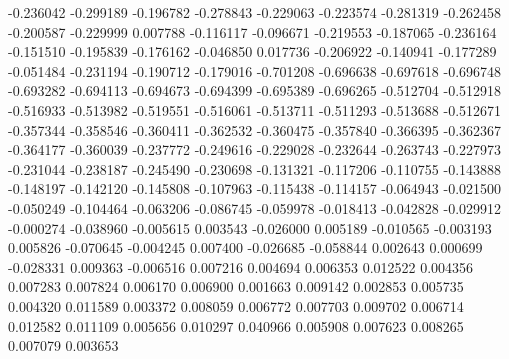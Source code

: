 -0.236042
-0.299189
-0.196782
-0.278843
-0.229063
-0.223574
-0.281319
-0.262458
-0.200587
-0.229999
0.007788
-0.116117
-0.096671
-0.219553
-0.187065
-0.236164
-0.151510
-0.195839
-0.176162
-0.046850
0.017736
-0.206922
-0.140941
-0.177289
-0.051484
-0.231194
-0.190712
-0.179016
-0.701208
-0.696638
-0.697618
-0.696748
-0.693282
-0.694113
-0.694673
-0.694399
-0.695389
-0.696265
-0.512704
-0.512918
-0.516933
-0.513982
-0.519551
-0.516061
-0.513711
-0.511293
-0.513688
-0.512671
-0.357344
-0.358546
-0.360411
-0.362532
-0.360475
-0.357840
-0.366395
-0.362367
-0.364177
-0.360039
-0.237772
-0.249616
-0.229028
-0.232644
-0.263743
-0.227973
-0.231044
-0.238187
-0.245490
-0.230698
-0.131321
-0.117206
-0.110755
-0.143888
-0.148197
-0.142120
-0.145808
-0.107963
-0.115438
-0.114157
-0.064943
-0.021500
-0.050249
-0.104464
-0.063206
-0.086745
-0.059978
-0.018413
-0.042828
-0.029912
-0.000274
-0.038960
-0.005615
0.003543
-0.026000
0.005189
-0.010565
-0.003193
0.005826
-0.070645
-0.004245
0.007400
-0.026685
-0.058844
0.002643
0.000699
-0.028331
0.009363
-0.006516
0.007216
0.004694
0.006353
0.012522
0.004356
0.007283
0.007824
0.006170
0.006900
0.001663
0.009142
0.002853
0.005735
0.004320
0.011589
0.003372
0.008059
0.006772
0.007703
0.009702
0.006714
0.012582
0.011109
0.005656
0.010297
0.040966
0.005908
0.007623
0.008265
0.007079
0.003653
